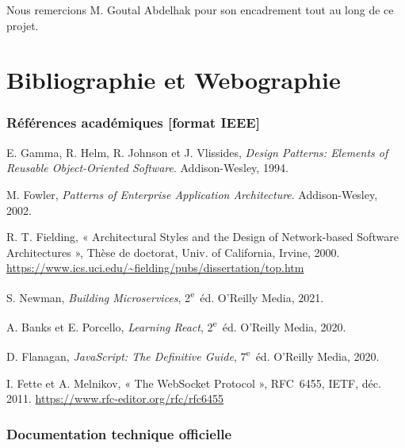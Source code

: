 \documentclass[12pt,a4paper]{report}
\begin{document}
Nous remercions M. Goutal Abdelhak pour son encadrement tout au long de ce projet.

\chapter*{Bibliographie et Webographie}
\thispagestyle{plain}

\subsection*{Références académiques [format IEEE]}

\begin{enumerate}[label={[\arabic*]},leftmargin=2.5em,itemsep=3pt]
  \item E. Gamma, R. Helm, R. Johnson et J. Vlissides, \textit{Design Patterns: Elements of Reusable Object-Oriented Software}. Addison-Wesley, 1994.
  \item M. Fowler, \textit{Patterns of Enterprise Application Architecture}. Addison-Wesley, 2002.
  \item R. T. Fielding, « Architectural Styles and the Design of Network-based Software Architectures », Thèse de doctorat, Univ. of California, Irvine, 2000. \url{https://www.ics.uci.edu/~fielding/pubs/dissertation/top.htm}
  \item S. Newman, \textit{Building Microservices}, 2\textsuperscript{e}~éd. O'Reilly Media, 2021.
  \item A. Banks et E. Porcello, \textit{Learning React}, 2\textsuperscript{e}~éd. O'Reilly Media, 2020.
  \item D. Flanagan, \textit{JavaScript: The Definitive Guide}, 7\textsuperscript{e}~éd. O'Reilly Media, 2020.
  \item I. Fette et A. Melnikov, « The WebSocket Protocol », RFC~6455, IETF, déc. 2011. \url{https://www.rfc-editor.org/rfc/rfc6455}
\end{enumerate}

\subsection*{Documentation technique officielle}
\end{document}
